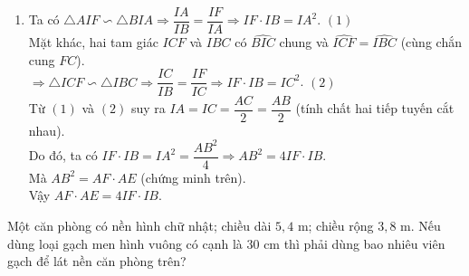 \begin{ex}
{\begin{enumerate}
					Mà $\widehat{ABF} = \widehat{BEF}$ (cùng chắn cung $BF$).\\
					$\Rightarrow \widehat{ABF} = \widehat{IAF}$.\\
					Hai tam giác $AIF$ và $BIA$ có $\widehat{AIB}$ chung và $\widehat{ABF} = \widehat{IAF}$.\\
					Suy ra $\triangle AIF \backsim \triangle BIA$.
			\item Ta có $\triangle AIF \backsim \triangle BIA \Rightarrow \dfrac{IA}{IB} = \dfrac{IF}{IA} \Rightarrow IF\cdot IB = IA^2$. \hfill $(1)$\\
					Mặt khác, hai tam giác $ICF$ và $IBC$ có $\widehat{BIC}$ chung và $\widehat{ICF} = \widehat{IBC}$ (cùng chắn cung $FC$).\\
					$\Rightarrow \triangle ICF \backsim \triangle IBC \Rightarrow \dfrac{IC}{IB} = \dfrac{IF}{IC} \Rightarrow IF\cdot IB = IC^2$. \hfill $(2)$\\
					Từ $(1)$ và $(2)$ suy ra $IA = IC = \dfrac{AC}{2} = \dfrac{AB}{2}$ (tính chất hai tiếp tuyến cắt nhau).\\
					Do đó, ta có $IF\cdot IB = IA^2 = \dfrac{AB^2}{4} \Rightarrow AB^2 = 4IF\cdot IB$.\\
					Mà  $AB^2 = AF\cdot AE$ (chứng minh trên).\\
					Vậy $AF\cdot AE = 4IF\cdot IB$.
		\end{enumerate}
	}
\end{ex}

\begin{ex}%
	Một căn phòng có nền hình chữ nhật; chiều dài $5{,}4$ m; chiều rộng $3{,}8$ m. Nếu dùng loại gạch men hình vuông có cạnh là $30$ cm thì phải dùng bao nhiêu viên gạch để lát nền căn phòng trên?
\end{ex}

